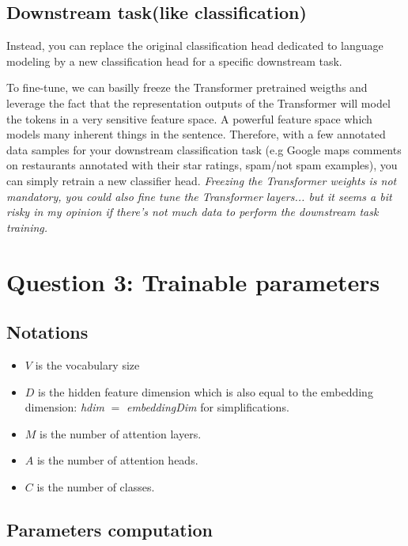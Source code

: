 \documentclass[a4paper]{article}
\begin{document}
\subsection*{Downstream task(like classification)}
Instead, you can replace the original classification head dedicated to language modeling by a new classification head for a specific downstream task. 

To fine-tune, we can basilly freeze the Transformer \cite{vaswani2017} pretrained weigths and leverage the fact that the representation outputs of the Transformer \cite{vaswani2017}
will model the tokens in a very sensitive feature space. A powerful feature space which models many inherent things in the sentence.
Therefore, with a few annotated data samples for your downstream classification task (e.g Google maps comments on restaurants annotated with their star ratings, spam/not spam examples), you can simply retrain a new classifier head.
\textit{Freezing the Transformer \cite{vaswani2017} weights is not mandatory, you could also fine tune the Transformer \cite{vaswani2017} layers... but it seems a bit risky in my opinion if there's not much data
to perform the downstream task training.} 

\pagebreak
\section{Question 3: Trainable parameters}

\subsection*{Notations}


\begin{itemize}
    \item $V$ is the vocabulary size
    \item $D$ is the hidden feature dimension which is also equal to the embedding dimension: \textit{hdim} $=$ \textit{embeddingDim} for simplifications.
    \item $M$ is the number of attention layers.
    \item $A$ is the number of attention heads.
    \item $C$ is the number of classes.
\end{itemize}

\subsection*{Parameters computation}
\end{document}
